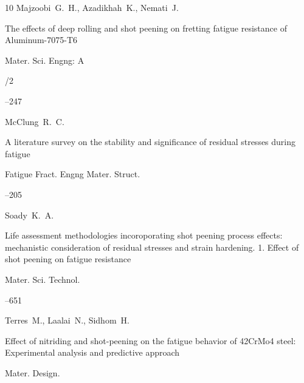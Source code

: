 \begin{thebibliography}{10}
\by Majzoobi~G.~H., Azadikhah~K., Nemati~J.

\paper The effects of deep rolling and shot peening on fretting fatigue resistance of Aluminum-7075-T6

\jour Mater. Sci. Engng: A



/2

--247






\by McClung~R.~C.

\paper A literature survey on the stability and significance of residual stresses during fatigue

\jour Fatigue Fract. Engng Mater. Struct.




--205






\by Soady~K.~A.

\paper Life assessment methodologies incoroporating shot peening process effects: mechanistic consideration of residual stresses and strain hardening. 1. Effect of shot peening on fatigue resistance

\jour Mater. Sci. Technol.




--651






\by Terres~M., Laalai~N., Sidhom~H.

\paper Effect of nitriding and shot-peening on the fatigue behavior of 42CrMo4 steel: Experimental analysis and predictive approach

\jour Mater. Design.



\end{thebibliography}
